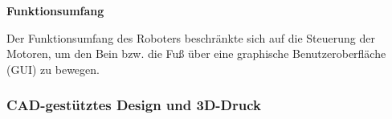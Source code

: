 


\textbf{Funktionsumfang}

Der Funktionsumfang des Roboters beschränkte sich auf die Steuerung der Motoren, um den Bein bzw. die Fuß über eine graphische Benutzeroberfläche (GUI) zu bewegen.

\subsubsection{CAD-gestütztes Design und 3D-Druck}

